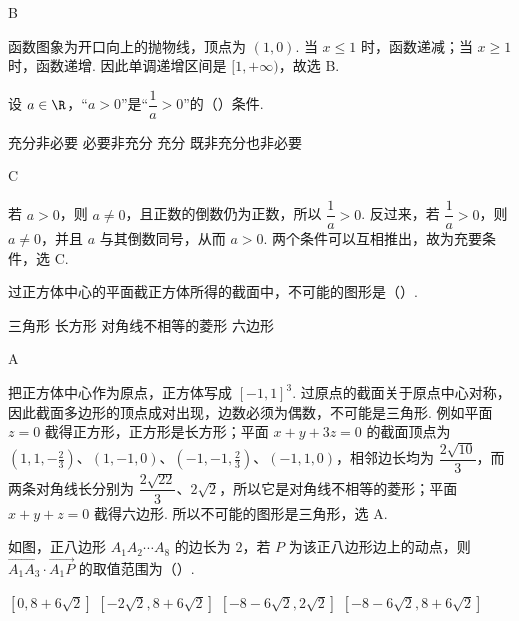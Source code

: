 \begin{answer}
B
\end{answer}

\begin{solution}
函数图象为开口向上的抛物线，顶点为 \((1,0)\). 当 \(x\leq1\) 时，函数递减；当 \(x\geq1\) 时，函数递增. 因此单调递增区间是 \([1,+\infty)\)，故选 B.
\end{solution}

\begin{problem}
设 \(a\in\R\)，“\(a>0\)”是“\(\dfrac1a>0\)”的（\quad）条件.

\choices
    {充分非必要}
    {必要非充分}
    {充分}
    {既非充分也非必要}
\end{problem}

\begin{answer}
C
\end{answer}

\begin{solution}
若 \(a>0\)，则 \(a\neq0\)，且正数的倒数仍为正数，所以 \(\dfrac1a>0\). 反过来，若 \(\dfrac1a>0\)，则 \(a\neq0\)，并且 \(a\) 与其倒数同号，从而 \(a>0\). 两个条件可以互相推出，故为充要条件，选 C.
\end{solution}

\begin{problem}
过正方体中心的平面截正方体所得的截面中，不可能的图形是（\quad）.

\choices
    {三角形}
    {长方形}
    {对角线不相等的菱形}
    {六边形}
\end{problem}

\begin{answer}
A
\end{answer}

\begin{solution}
把正方体中心作为原点，正方体写成 \([-1,1]^3\). 过原点的截面关于原点中心对称，因此截面多边形的顶点成对出现，边数必须为偶数，不可能是三角形. 例如平面 \(z=0\) 截得正方形，正方形是长方形；平面 \(x+y+3z=0\) 的截面顶点为 \((1,1,-\frac23)\)、\((1,-1,0)\)、\((-1,-1,\frac23)\)、\((-1,1,0)\)，相邻边长均为 \(\dfrac{2\sqrt{10}}3\)，而两条对角线长分别为 \(\dfrac{2\sqrt{22}}3\)、\(2\sqrt2\)，所以它是对角线不相等的菱形；平面 \(x+y+z=0\) 截得六边形. 所以不可能的图形是三角形，选 A.
\end{solution}

\begin{problem}
如图，正八边形 \(A_1A_2\cdots A_8\) 的边长为 \(2\)，若 \(P\) 为该正八边形边上的动点，则 \(\overrightarrow{A_1A_3}\cdot \overrightarrow{A_1P}\) 的取值范围为（\quad）.


\choices
    {\([0,8+6\sqrt2]\)}
    {\([-2\sqrt2,8+6\sqrt2]\)}
    {\([-8-6\sqrt2,2\sqrt2]\)}
    {\([-8-6\sqrt2,8+6\sqrt2]\)}
\end{problem}

